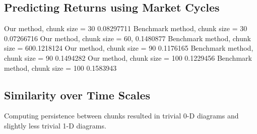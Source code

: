 \documentclass{article}
\begin{document}
\subsection{Predicting Returns using Market Cycles}
Our method, chunk size = 30 0.08297711
Benchmark method, chunk size = 30 0.07266716
Our method, chunk size = 60, 0.1480877
Benchmark method, chunk size = 600.1218124
Our method, chunk size = 90 0.1176165
Benchmark method, chunk size = 90 0.1494282
Our method, chunk size = 100 0.1229456
Benchmark method, chunk size = 100 0.1583943


\subsection{Similarity over Time Scales}
Computing persistence between chunks resulted in trivial 0-D diagrams and slightly less trivial 1-D diagrams.
\end{document}
